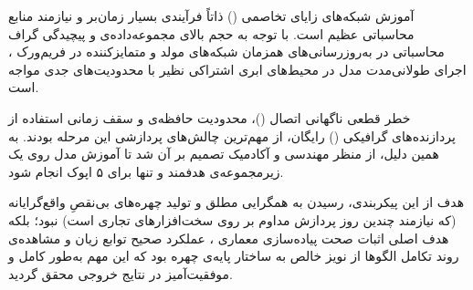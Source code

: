 \begin{warnbox}
آموزش شبکه‌های زایای تخاصمی () ذاتاً فرآیندی بسیار زمان‌بر و نیازمند منابع محاسباتی عظیم است. با توجه به حجم بالای مجموعه‌داده‌ی  و پیچیدگی گراف محاسباتی در به‌روزرسانی‌های همزمان شبکه‌های مولد و متمایزکننده در فریم‌ورک ، اجرای طولانی‌مدت مدل در محیط‌های ابری اشتراکی نظیر  با محدودیت‌های جدی مواجه است. 

خطر قطعی ناگهانی اتصال ()، محدودیت حافظه‌ی  و سقف زمانی استفاده از پردازنده‌های گرافیکی () رایگان، از مهم‌ترین چالش‌های پردازشی این مرحله بودند. به همین دلیل، از منظر مهندسی و آکادمیک تصمیم بر آن شد تا آموزش مدل روی یک زیرمجموعه‌ی هدفمند و تنها برای ۵ اپوک انجام شود. 

هدف از این پیکربندی، رسیدن به همگرایی مطلق و تولید چهره‌های بی‌نقصِ واقع‌گرایانه (که نیازمند چندین روز پردازش مداوم بر روی سخت‌افزارهای تجاری است) نبود؛ بلکه هدف اصلی اثبات صحت پیاده‌سازی معماری ، عملکرد صحیح توابع زیان و مشاهده‌ی روند تکامل الگوها از نویز خالص به ساختار پایه‌ی چهره بود که این مهم به‌طور کامل و موفقیت‌آمیز در نتایج خروجی محقق گردید.
\end{warnbox}